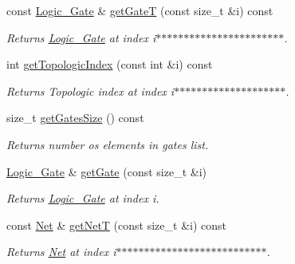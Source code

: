 \begin{DoxyCompactItemize}
const \hyperlink{structCircuit__Netlist_1_1Logic__Gate}{Logic\-\_\-\-Gate} \& \hyperlink{classCircuit__Netlist_a3413fe728fb06a6b5b71be6d676b59de}{get\-Gate\-T} (const size\-\_\-t \&i) const 
\begin{DoxyCompactList}\small\item\em Returns \hyperlink{structCircuit__Netlist_1_1Logic__Gate}{Logic\-\_\-\-Gate} at index i$\ast$$\ast$$\ast$$\ast$$\ast$$\ast$$\ast$$\ast$$\ast$$\ast$$\ast$$\ast$$\ast$$\ast$$\ast$$\ast$$\ast$$\ast$$\ast$$\ast$$\ast$$\ast$$\ast$. \end{DoxyCompactList}\item 
int \hyperlink{classCircuit__Netlist_a287e1aaee9b917ce7d1192b7c3914009}{get\-Topologic\-Index} (const int \&i) const 
\begin{DoxyCompactList}\small\item\em Returns Topologic index at index i$\ast$$\ast$$\ast$$\ast$$\ast$$\ast$$\ast$$\ast$$\ast$$\ast$$\ast$$\ast$$\ast$$\ast$$\ast$$\ast$$\ast$$\ast$$\ast$$\ast$. \end{DoxyCompactList}\item 
size\-\_\-t \hyperlink{classCircuit__Netlist_aa0abd4b9e4a774c8baf83a5b1c141e67}{get\-Gates\-Size} () const 
\begin{DoxyCompactList}\small\item\em Returns number os elements in gates list. \end{DoxyCompactList}\item 
\hyperlink{structCircuit__Netlist_1_1Logic__Gate}{Logic\-\_\-\-Gate} \& \hyperlink{classCircuit__Netlist_a2c7c0bc6951c71564f8158682678d118}{get\-Gate} (const size\-\_\-t \&i)
\begin{DoxyCompactList}\small\item\em Returns \hyperlink{structCircuit__Netlist_1_1Logic__Gate}{Logic\-\_\-\-Gate} at index i. \end{DoxyCompactList}\item 
const \hyperlink{structCircuit__Netlist_1_1Net}{Net} \& \hyperlink{classCircuit__Netlist_a9dfc3ea50ca3a6f87ffac564011b85e2}{get\-Net\-T} (const size\-\_\-t \&i) const 
\begin{DoxyCompactList}\small\item\em Returns \hyperlink{structCircuit__Netlist_1_1Net}{Net} at index i$\ast$$\ast$$\ast$$\ast$$\ast$$\ast$$\ast$$\ast$$\ast$$\ast$$\ast$$\ast$$\ast$$\ast$$\ast$$\ast$$\ast$$\ast$$\ast$$\ast$$\ast$$\ast$$\ast$$\ast$$\ast$$\ast$$\ast$. \end{DoxyCompactList}\item 

\end{DoxyCompactItemize}
